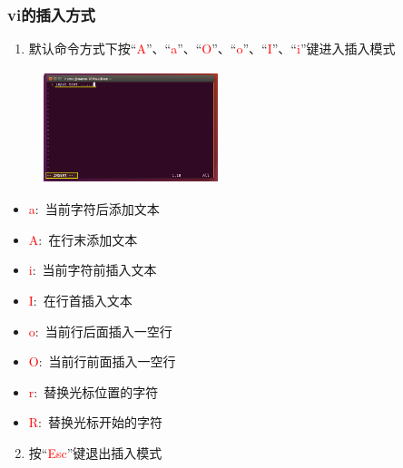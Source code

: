 \frame
{
	\frametitle{\textrm{vi}的插入方式}
	\begin{enumerate}
		\item 默认命令方式下按``\textcolor{red}{A}''、``\textcolor{red}{a}''、``\textcolor{red}{O}''、``\textcolor{red}{o}''、``\textcolor{red}{I}''、``\textcolor{red}{i}''键进入插入模式
	\end{enumerate}
\begin{minipage}{0.48\textwidth}
\begin{figure}[h!]
\centering
\hspace*{-0.5pt}
\includegraphics[height=1.3in,width=2.0in,viewport=8 0 700 460,clip]{Figures/vim-insert.png}
\label{vim-command-insert}
\end{figure}
\end{minipage}
\begin{minipage}{0.50\textwidth}
	\begin{itemize}
		\item \textcolor{red}{a}:~当前字符后添加文本
		\item \textcolor{red}{A}:~在行末添加文本
		\item \textcolor{red}{i}:~当前字符前插入文本
		\item \textcolor{red}{I}:~在行首插入文本
		\item \textcolor{red}{o}:~当前行后面插入一空行
		\item \textcolor{red}{O}:~当前行前面插入一空行
		\item \textcolor{red}{r}:~替换光标位置的字符
		\item \textcolor{red}{R}:~替换光标开始的字符
	\end{itemize}
\end{minipage}
	\begin{enumerate}
			\setcounter{enumi}{1}
		\item 按``\textcolor{red}{Esc}''键退出插入模式
	\end{enumerate}
}

